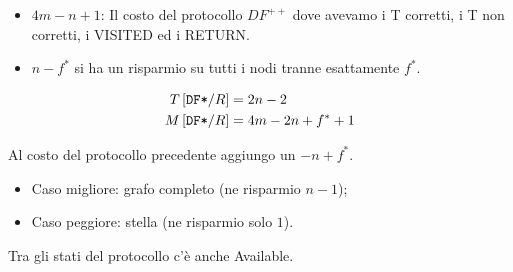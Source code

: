 \begin{itemize}
    \item $ 4m - n + 1$: Il costo del protocollo $DF^{++}$ dove avevamo i T
          corretti, i T non corretti, i VISITED ed i RETURN.
    \item $n-f^*$ si ha un risparmio su tutti i nodi tranne esattamente $f^*$.
\end{itemize}

\begin{equation*}
    \begin{split}
        T\left[\text{\texttt{DF*}}/R\right] & = 2n - 2\\
        M\left[\text{\texttt{DF*}}/R\right] & = 4m - 2n + f^* + 1
    \end{split}
\end{equation*}

Al costo del protocollo precedente aggiungo un $-n+f^*$.
\begin{itemize}
    \item Caso migliore: grafo completo (ne risparmio $n-1$);
    \item Caso peggiore: stella (ne risparmio solo $1$).
\end{itemize}
Tra gli stati del protocollo c'è anche Available.

